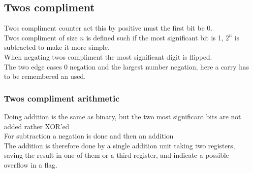 \documentclass[12pt, a4paper]{article}
\begin{document}
		\subsection{Twos compliment}
			Twos compliment counter act this by positive must the first bit be 0.\\
			Twos compliment of size $n$ is defined such if the most significant bit is 1, $2^n$ is subtracted to make it more simple.\\
			When negating twos compliment the most significant digit is flipped.\\
			The two edge cases 0 negation and the largest number negation, here a carry has to be remembered an used.\\
			\subsubsection{Twos compliment arithmetic}
				Doing addition is the same as binary, but the two most significant bits are not added rather XOR'ed\\
				For subtraction a negation is done and then an addition\\
				The addition is therefore done by a single addition unit taking two registers, saving the result in one of them or a third register, and indicate a possible overflow in a flag.\\
\end{document}
